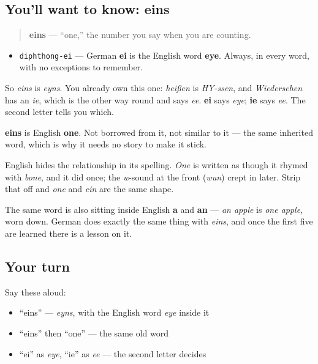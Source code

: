 \subsection*{You'll want to know: eins}
\begin{quote}
\textbf{eins} — \textquotedblleft{}one,\textquotedblright{} the number you say when you are counting.
\end{quote}

\begin{sounds}
\begin{itemize}
\raggedright
  \item \texttt{diphthong-ei} — German \textbf{ei} is the English word \textbf{eye}. Always, in every word, with no exceptions to remember.
\end{itemize}

So \emph{eins} is \emph{eyns}. You already own this one: \emph{heißen} is \emph{HY-ssen}, and \emph{Wiedersehen} has an \emph{ie}, which is the other way round and says \emph{ee}. \textbf{ei} says \emph{eye}; \textbf{ie} says \emph{ee}. The second letter tells you which.
\end{sounds}

\begin{cousinweb}
\textbf{eins} is English \textbf{one}. Not borrowed from it, not similar to it — the same inherited word, which is why it needs no story to make it stick.

English hides the relationship in its spelling. \emph{One} is written as though it rhymed with \emph{bone}, and it did once; the \emph{w}-sound at the front (\emph{wun}) crept in later. Strip that off and \emph{one} and \emph{ein} are the same shape.

The same word is also sitting inside English \textbf{a} and \textbf{an} — \emph{an apple} is \emph{one apple}, worn down. German does exactly the same thing with \emph{eins}, and once the first five are learned there is a lesson on it.
\end{cousinweb}

\subsection*{Your turn}
Say these aloud:

\begin{itemize}
\raggedright
  \item \textquotedblleft{}eins\textquotedblright{} — \emph{eyns}, with the English word \emph{eye} inside it
  \item \textquotedblleft{}eins\textquotedblright{} then \textquotedblleft{}one\textquotedblright{} — the same old word
  \item \textquotedblleft{}ei\textquotedblright{} as \emph{eye}, \textquotedblleft{}ie\textquotedblright{} as \emph{ee} — the second letter decides
\end{itemize}

